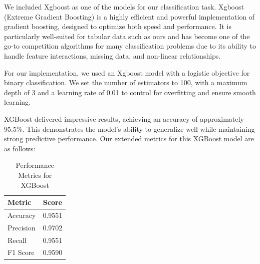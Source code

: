 \documentclass[manuscript,screen,review, nonacm]{acmart}
\begin{document}
We included Xgboost as one of the models for our classification task. Xgboost 
(Extreme Gradient Boosting) is a highly efficient and powerful implementation of 
gradient boosting, designed to optimize both speed and performance. It is particularly
well-suited for tabular data such as ours and has become one of the go-to competition algorithms 
for many classification problems due to its ability to handle feature interactions, 
missing data, and non-linear relationships.

For our implementation, we used an Xgboost model with a logistic objective for binary 
classification. We set the number of estimators to 100, with a maximum depth of 3 
and a learning rate of 0.01 to control for overfitting and ensure smooth learning. 

XGBoost delivered impressive results, achieving an accuracy of approximately 95.5\%. 
This demonstrates the model’s ability to generalize well while maintaining strong 
predictive performance. Our extended metrics for this XGBoost model are as follows:

\begin{table}[H]
    \centering
    \begin{tabular}{@{}lc@{}}
        \toprule
        \textbf{Metric} & \textbf{Score} \\ \midrule
        Accuracy  & 0.9551 \\
        Precision & 0.9702 \\
        Recall    & 0.9551 \\
        F1 Score  & 0.9590 \\ \bottomrule
    \end{tabular}
    \caption{Performance Metrics for XGBoost}
\end{table}
\end{document}
